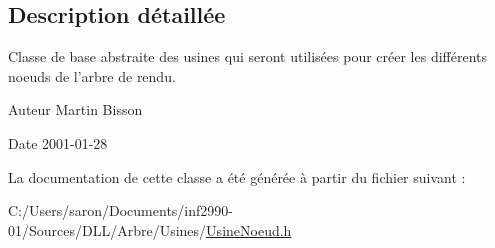\subsection{Description détaillée}
Classe de base abstraite des usines qui seront utilisées pour créer les différents noeuds de l'arbre de rendu. 

\begin{DoxyAuthor}{Auteur}
Martin Bisson 
\end{DoxyAuthor}
\begin{DoxyDate}{Date}
2001-\/01-\/28 
\end{DoxyDate}


La documentation de cette classe a été générée à partir du fichier suivant \-:\begin{DoxyCompactItemize}
\item 
C\-:/\-Users/saron/\-Documents/inf2990-\/01/\-Sources/\-D\-L\-L/\-Arbre/\-Usines/\hyperlink{_usine_noeud_8h}{Usine\-Noeud.\-h}\end{DoxyCompactItemize}
